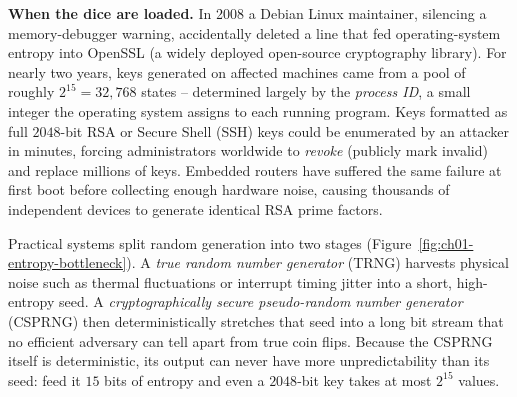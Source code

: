 \begin{attackbox}
\textbf{When the dice are loaded.} In 2008 a Debian Linux maintainer, silencing a memory-debugger warning, accidentally deleted a line that fed operating-system entropy into OpenSSL (a widely deployed open-source cryptography library). For nearly two years, keys generated on affected machines came from a pool of roughly $2^{15} = 32{,}768$ states -- determined largely by the \emph{process ID}, a small integer the operating system assigns to each running program. Keys formatted as full $2048$-bit RSA or Secure Shell (SSH) keys could be enumerated by an attacker in minutes, forcing administrators worldwide to \emph{revoke} (publicly mark invalid) and replace millions of keys. Embedded routers have suffered the same failure at first boot before collecting enough hardware noise, causing thousands of independent devices to generate identical RSA prime factors.
\end{attackbox}

Practical systems split random generation into two stages (Figure~\ref{fig:ch01-entropy-bottleneck}). A \emph{true random number generator} (TRNG) harvests physical noise such as thermal fluctuations or interrupt timing jitter into a short, high-entropy seed. A \emph{cryptographically secure pseudo-random number generator} (CSPRNG) then deterministically stretches that seed into a long bit stream that no efficient adversary can tell apart from true coin flips. Because the CSPRNG itself is deterministic, its output can never have more unpredictability than its seed: feed it $15$ bits of entropy and even a $2048$-bit key takes at most $2^{15}$ values.

